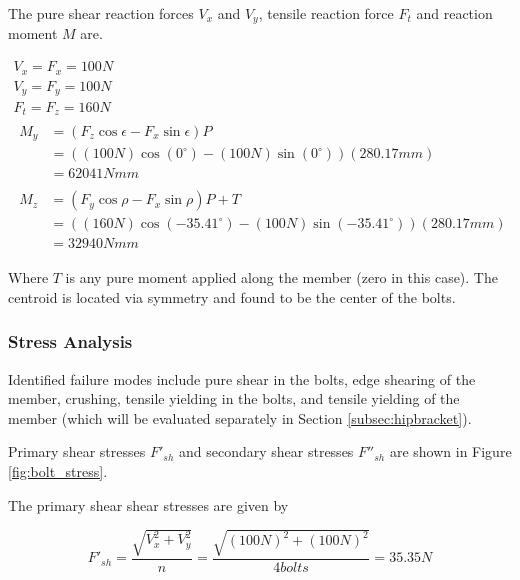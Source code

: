 The pure shear reaction forces $V_x$ and $V_y$, tensile reaction force $F_t$ and reaction moment $M$ are.

\begin{gather}
    V_x = F_x = 100N\label{eq:bolt_reaction_shear_x}
    \\
    V_y = F_y = 100N\label{eq:bolt_reaction_shear_y}
    \\
    F_t = F_z = 160N\label{eq:bolt_reaction_shear_z}
    \\
    \begin{split}
        M_y &= (F_z \cos{\epsilon} - F_x \sin{\epsilon})P 
        \\
        &= ((100N)\cos(0^{\circ}) - (100N)\sin(0^{\circ}))(280.17mm) 
        \\
        &=  62041Nmm \label{eq:bolt_reaction_moment_y}
    \end{split}
    \\
    \begin{split}
        M_z &= (F_y \cos{\rho} - F_x \sin{\rho}) P + T 
        \\
        &= ((160N)\cos(-35.41^{\circ}) - (100N)\sin(-35.41^{\circ}))(280.17mm) 
        \\
        &= 32940Nmm \label{eq:bolt_reaction_moment_z}
    \end{split}
\end{gather}

Where $T$ is any pure moment applied along the member (zero in this case).
The centroid is located via symmetry and found to be the center of the bolts.


\subsubsection{Stress Analysis}

Identified failure modes include pure shear in the bolts, edge shearing of the member, crushing, tensile yielding in the bolts, and tensile yielding of the member (which will be evaluated separately in Section \ref{subsec:hipbracket}).


Primary shear stresses $F'_{sh}$ and secondary shear stresses $F''_{sh}$ are shown in Figure \ref{fig:bolt_stress}.

The primary shear shear stresses are given by

\begin{equation} \label{eq:bolt_shear_force_1}
    F'_{sh}= \frac{ \sqrt{V_x^2 + V_y^2} }{n} = \frac{\sqrt{(100N)^2 + (100N)^2}}{4{bolts}} = 35.35N
\end{equation}

